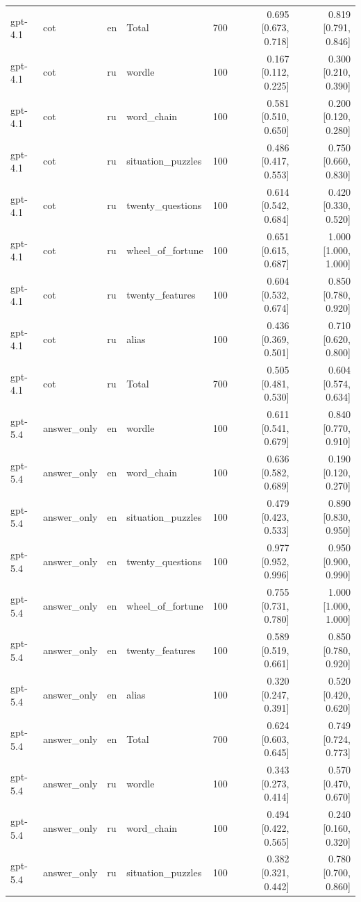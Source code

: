 \begin{longtable}{llllrrr}
gpt-4.1 & cot & en & Total & 700 & 0.695 [0.673, 0.718] & 0.819 [0.791, 0.846] \\
gpt-4.1 & cot & ru & wordle & 100 & 0.167 [0.112, 0.225] & 0.300 [0.210, 0.390] \\
gpt-4.1 & cot & ru & word\_chain & 100 & 0.581 [0.510, 0.650] & 0.200 [0.120, 0.280] \\
gpt-4.1 & cot & ru & situation\_puzzles & 100 & 0.486 [0.417, 0.553] & 0.750 [0.660, 0.830] \\
gpt-4.1 & cot & ru & twenty\_questions & 100 & 0.614 [0.542, 0.684] & 0.420 [0.330, 0.520] \\
gpt-4.1 & cot & ru & wheel\_of\_fortune & 100 & 0.651 [0.615, 0.687] & 1.000 [1.000, 1.000] \\
gpt-4.1 & cot & ru & twenty\_features & 100 & 0.604 [0.532, 0.674] & 0.850 [0.780, 0.920] \\
gpt-4.1 & cot & ru & alias & 100 & 0.436 [0.369, 0.501] & 0.710 [0.620, 0.800] \\
gpt-4.1 & cot & ru & Total & 700 & 0.505 [0.481, 0.530] & 0.604 [0.574, 0.634] \\
gpt-5.4 & answer\_only & en & wordle & 100 & 0.611 [0.541, 0.679] & 0.840 [0.770, 0.910] \\
gpt-5.4 & answer\_only & en & word\_chain & 100 & 0.636 [0.582, 0.689] & 0.190 [0.120, 0.270] \\
gpt-5.4 & answer\_only & en & situation\_puzzles & 100 & 0.479 [0.423, 0.533] & 0.890 [0.830, 0.950] \\
gpt-5.4 & answer\_only & en & twenty\_questions & 100 & 0.977 [0.952, 0.996] & 0.950 [0.900, 0.990] \\
gpt-5.4 & answer\_only & en & wheel\_of\_fortune & 100 & 0.755 [0.731, 0.780] & 1.000 [1.000, 1.000] \\
gpt-5.4 & answer\_only & en & twenty\_features & 100 & 0.589 [0.519, 0.661] & 0.850 [0.780, 0.920] \\
gpt-5.4 & answer\_only & en & alias & 100 & 0.320 [0.247, 0.391] & 0.520 [0.420, 0.620] \\
gpt-5.4 & answer\_only & en & Total & 700 & 0.624 [0.603, 0.645] & 0.749 [0.724, 0.773] \\
gpt-5.4 & answer\_only & ru & wordle & 100 & 0.343 [0.273, 0.414] & 0.570 [0.470, 0.670] \\
gpt-5.4 & answer\_only & ru & word\_chain & 100 & 0.494 [0.422, 0.565] & 0.240 [0.160, 0.320] \\
gpt-5.4 & answer\_only & ru & situation\_puzzles & 100 & 0.382 [0.321, 0.442] & 0.780 [0.700, 0.860] \\

\end{longtable}
